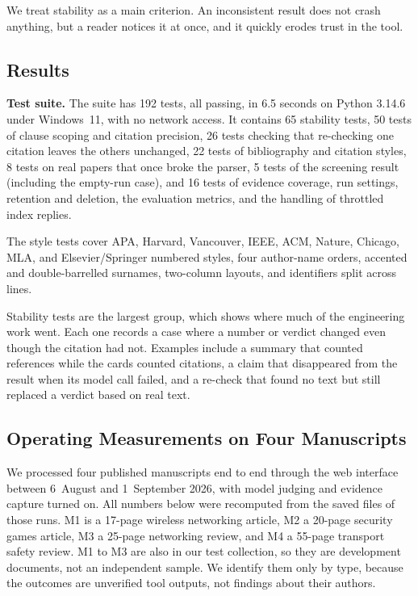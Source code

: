 \documentclass{article}
\newcommand{\vd}[1]{\texttt{\detokenize{#1}}}
\begin{document}
We treat stability as a main criterion. An inconsistent result does not crash anything, but a reader notices it at once, and it quickly erodes trust in the tool.

\subsection{Results}
\label{sec:results}

\textbf{Test suite.} The suite has 192 tests, all passing, in 6.5 seconds on Python 3.14.6 under Windows~11, with no network access. It contains 65 stability tests, 50 tests of clause scoping and citation precision, 26 tests checking that re-checking one citation leaves the others unchanged, 22 tests of bibliography and citation styles, 8 tests on real papers that once broke the parser, 5 tests of the screening result (including the empty-run case), and 16 tests of evidence coverage, run settings, retention and deletion, the evaluation metrics, and the handling of throttled index replies.

The style tests cover APA, Harvard, Vancouver, IEEE, ACM, Nature, Chicago, MLA, and Elsevier/Springer numbered styles, four author-name orders, accented and double-barrelled surnames, two-column layouts, and identifiers split across lines.

Stability tests are the largest group, which shows where much of the engineering work went. Each one records a case where a number or verdict changed even though the citation had not. Examples include a summary that counted references while the cards counted citations, a claim that disappeared from the result when its model call failed, and a re-check that found no text but still replaced a verdict based on real text.

\subsection{Operating Measurements on Four Manuscripts}
\label{sec:operating}

We processed four published manuscripts end to end through the web interface between 6~August and 1~September 2026, with model judging and evidence capture turned on. All numbers below were recomputed from the saved \vd{report.json} files of those runs. M1 is a 17-page wireless networking article, M2 a 20-page security games article, M3 a 25-page networking review, and M4 a 55-page transport safety review. M1 to M3 are also in our test collection, so they are development documents, not an independent sample. We identify them only by type, because the outcomes are unverified tool outputs, not findings about their authors.
\end{document}
